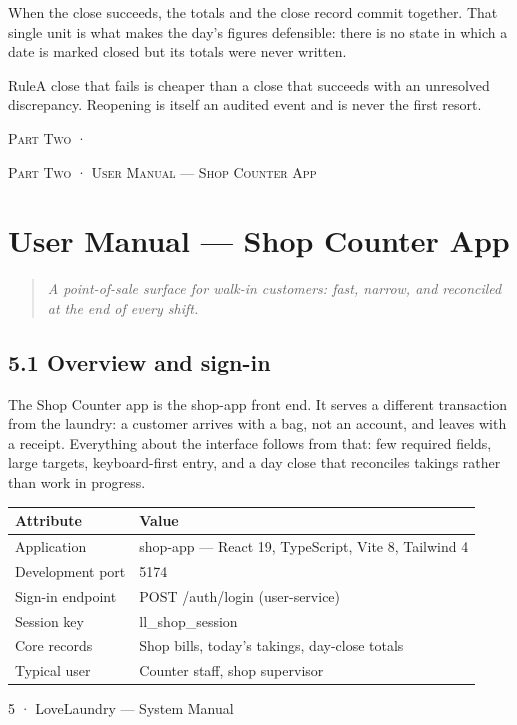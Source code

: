 \documentclass[11pt,a4paper,oneside]{book}
\begin{document}
When the close succeeds, the totals and the close record commit together. That single unit is what makes the day's figures defensible: there is no state in which a date is marked closed but its totals were never written.

\begin{notebox}RuleA close that fails is cheaper than a close that succeeds with an unresolved discrepancy. Reopening is itself an audited event and is never the first resort.\end{notebox}
\textsc{\small\color{crimson}Part Two ·}\par\medskip
\textsc{\small\color{crimson}Part Two · User Manual — Shop Counter App}\par\medskip
\chapter{User Manual — Shop Counter App}
\begin{quote}\itshape A point-of-sale surface for walk-in customers: fast, narrow, and reconciled at the end of every shift.\end{quote}
\section{5.1 Overview and sign-in}
The Shop Counter app is the shop-app front end. It serves a different transaction from the laundry: a customer arrives with a bag, not an account, and leaves with a receipt. Everything about the interface follows from that: few required fields, large targets, keyboard-first entry, and a day close that reconciles takings rather than work in progress.

\begin{center}\small
\begin{tabularx}{\linewidth}{|X|X|}
\hline
\rowcolor{lightgrey}
\textbf{Attribute} & \textbf{Value} \\ \hline
Application & shop-app — React 19, TypeScript, Vite 8, Tailwind 4 \\ \hline
Development port & 5174 \\ \hline
Sign-in endpoint & POST /auth/login (user-service) \\ \hline
Session key & ll\_shop\_session \\ \hline
Core records & Shop bills, today's takings, day-close totals \\ \hline
Typical user & Counter staff, shop supervisor \\ \hline
\end{tabularx}
\end{center}
5 · LoveLaundry — System Manual
\end{document}

